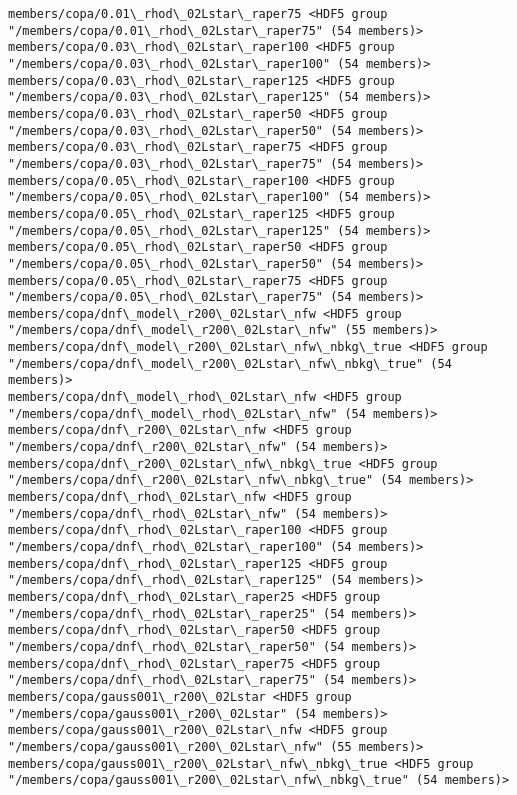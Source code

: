 \documentclass[11pt]{article}
\begin{document}
\begin{Verbatim}[commandchars=\\\{\}]
members/copa/0.01\_rhod\_02Lstar\_raper75 <HDF5 group "/members/copa/0.01\_rhod\_02Lstar\_raper75" (54 members)>
members/copa/0.03\_rhod\_02Lstar\_raper100 <HDF5 group "/members/copa/0.03\_rhod\_02Lstar\_raper100" (54 members)>
members/copa/0.03\_rhod\_02Lstar\_raper125 <HDF5 group "/members/copa/0.03\_rhod\_02Lstar\_raper125" (54 members)>
members/copa/0.03\_rhod\_02Lstar\_raper50 <HDF5 group "/members/copa/0.03\_rhod\_02Lstar\_raper50" (54 members)>
members/copa/0.03\_rhod\_02Lstar\_raper75 <HDF5 group "/members/copa/0.03\_rhod\_02Lstar\_raper75" (54 members)>
members/copa/0.05\_rhod\_02Lstar\_raper100 <HDF5 group "/members/copa/0.05\_rhod\_02Lstar\_raper100" (54 members)>
members/copa/0.05\_rhod\_02Lstar\_raper125 <HDF5 group "/members/copa/0.05\_rhod\_02Lstar\_raper125" (54 members)>
members/copa/0.05\_rhod\_02Lstar\_raper50 <HDF5 group "/members/copa/0.05\_rhod\_02Lstar\_raper50" (54 members)>
members/copa/0.05\_rhod\_02Lstar\_raper75 <HDF5 group "/members/copa/0.05\_rhod\_02Lstar\_raper75" (54 members)>
members/copa/dnf\_model\_r200\_02Lstar\_nfw <HDF5 group "/members/copa/dnf\_model\_r200\_02Lstar\_nfw" (55 members)>
members/copa/dnf\_model\_r200\_02Lstar\_nfw\_nbkg\_true <HDF5 group "/members/copa/dnf\_model\_r200\_02Lstar\_nfw\_nbkg\_true" (54 members)>
members/copa/dnf\_model\_rhod\_02Lstar\_nfw <HDF5 group "/members/copa/dnf\_model\_rhod\_02Lstar\_nfw" (54 members)>
members/copa/dnf\_r200\_02Lstar\_nfw <HDF5 group "/members/copa/dnf\_r200\_02Lstar\_nfw" (54 members)>
members/copa/dnf\_r200\_02Lstar\_nfw\_nbkg\_true <HDF5 group "/members/copa/dnf\_r200\_02Lstar\_nfw\_nbkg\_true" (54 members)>
members/copa/dnf\_rhod\_02Lstar\_nfw <HDF5 group "/members/copa/dnf\_rhod\_02Lstar\_nfw" (54 members)>
members/copa/dnf\_rhod\_02Lstar\_raper100 <HDF5 group "/members/copa/dnf\_rhod\_02Lstar\_raper100" (54 members)>
members/copa/dnf\_rhod\_02Lstar\_raper125 <HDF5 group "/members/copa/dnf\_rhod\_02Lstar\_raper125" (54 members)>
members/copa/dnf\_rhod\_02Lstar\_raper25 <HDF5 group "/members/copa/dnf\_rhod\_02Lstar\_raper25" (54 members)>
members/copa/dnf\_rhod\_02Lstar\_raper50 <HDF5 group "/members/copa/dnf\_rhod\_02Lstar\_raper50" (54 members)>
members/copa/dnf\_rhod\_02Lstar\_raper75 <HDF5 group "/members/copa/dnf\_rhod\_02Lstar\_raper75" (54 members)>
members/copa/gauss001\_r200\_02Lstar <HDF5 group "/members/copa/gauss001\_r200\_02Lstar" (54 members)>
members/copa/gauss001\_r200\_02Lstar\_nfw <HDF5 group "/members/copa/gauss001\_r200\_02Lstar\_nfw" (55 members)>
members/copa/gauss001\_r200\_02Lstar\_nfw\_nbkg\_true <HDF5 group "/members/copa/gauss001\_r200\_02Lstar\_nfw\_nbkg\_true" (54 members)>

\end{Verbatim}
\end{document}
